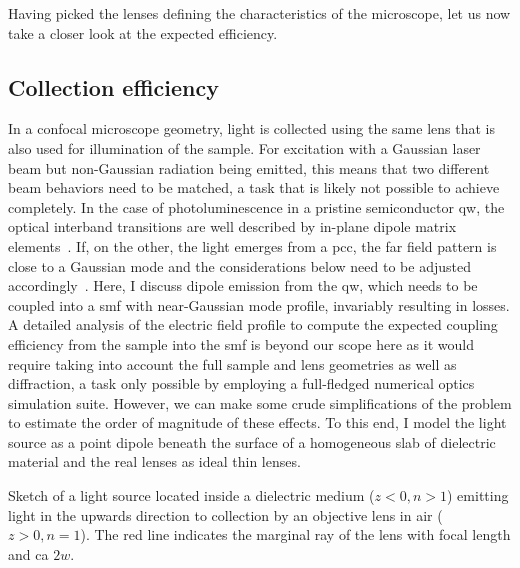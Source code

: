 Having picked the lenses defining the characteristics of the microscope, let us now take a closer look at the expected efficiency.

\subsection{Collection efficiency}\label{subsec:setup:optics:coupling:efficiency}
In a confocal microscope geometry, light is collected using the same lens that is also used for illumination of the sample.
For excitation with a Gaussian laser beam but non-Gaussian radiation being emitted, this means that two different beam behaviors need to be matched, a task that is likely not possible to achieve completely.
In the case of photoluminescence in a pristine semiconductor \gls{qw}, the optical interband transitions are well described by in-plane dipole matrix elements~\cite{Gu2013}.
If, on the other, the light emerges from a \gls{pcc}, the far field pattern is close to a Gaussian mode and the considerations below need to be adjusted accordingly~\cite{Wu2024}.
Here, I discuss dipole emission from the \gls{qw}, which needs to be coupled into a \gls{smf} with near-Gaussian mode profile, invariably resulting in losses.
A detailed analysis of the electric field profile to compute the expected coupling efficiency from the sample into the \gls{smf} is beyond our scope here as it would require taking into account the full sample and lens geometries as well as diffraction, a task only possible by employing a full-fledged numerical optics simulation suite.
However, we can make some crude simplifications of the problem to estimate the order of magnitude of these effects.
To this end, I model the light source as a point dipole beneath the surface of a homogeneous slab of dielectric material and the real lenses as ideal thin lenses.

\begin{marginfigure}
    
    \caption[]{
        Sketch of a light source located inside a dielectric medium ($z < 0, n > 1$) emitting light in the upwards direction to collection by an objective lens in air ($z > 0, n = 1$).
        The red line indicates the marginal ray of the lens with focal length \fob and \gls{ca} $2w$.
    }
    \label{fig:setup:optics:coupling:emission}
\end{marginfigure}


